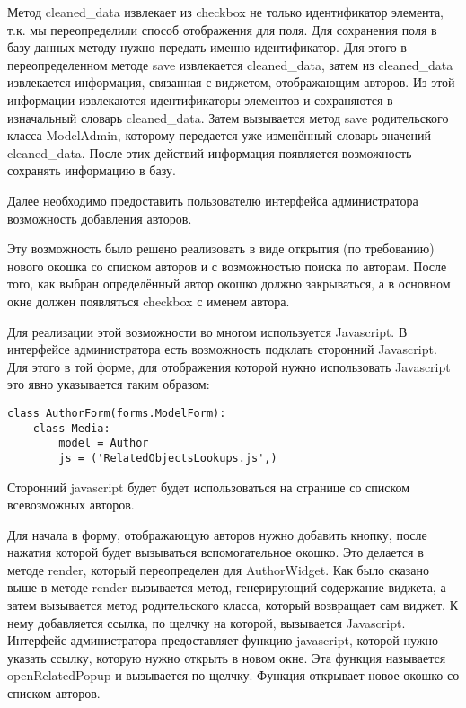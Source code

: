 Метод cleaned\_data извлекает из checkbox не только идентификатор элемента, т.к. мы переопределили способ отображения для поля. Для сохранения поля в базу данных методу нужно передать именно идентификатор. Для этого в переопределенном методе save извлекается cleaned\_data, затем из cleaned\_data извлекается информация, связанная с виджетом, отображающим авторов. Из этой информации извлекаются идентификаторы элементов и сохраняются в изначальный словарь cleaned\_data. Затем вызывается метод save родительского класса ModelAdmin, которому передается уже изменённый словарь значений cleaned\_data. После этих действий информация появляется возможность сохранять информацию в базу.

Далее необходимо предоставить пользователю интерфейса администратора возможность добавления авторов. 

Эту возможность было решено реализовать в виде открытия (по требованию) нового окошка со списком авторов и с возможностью поиска по авторам. После того, как выбран определённый автор окошко должно закрываться, а в основном окне должен появляться checkbox с именем автора. 

Для реализации этой возможности во многом используется Javascript. В интерфейсе администратора есть возможность подклать сторонний Java\-script. Для этого в той форме, для отображения которой нужно использовать Javascript это явно указывается таким образом:

{
\small \begin{verbatim}
class AuthorForm(forms.ModelForm):
    class Media:
    	model = Author
        js = ('RelatedObjectsLookups.js',)

\end{verbatim}
}

Сторонний javascript будет будет использоваться на странице со списком всевозможных авторов.

Для начала в форму, отображающую авторов нужно добавить кнопку, после нажатия которой будет вызываться вспомогательное окошко. Это делается в методе render, который переопределен для AuthorWidget. Как было сказано выше в методе render вызывается метод, генерирующий содержание виджета, а затем вызывается метод родительского класса, который возвращает сам виджет. К нему добавляется ссылка, по щелчку на которой, вызывается Javascript. Интерфейс администратора предоставляет функцию javascript, которой нужно указать ссылку, которую нужно открыть в новом окне. Эта функция называется openRelatedPopup и вызывается по щелчку. Функция открывает новое окошко со списком авторов.

